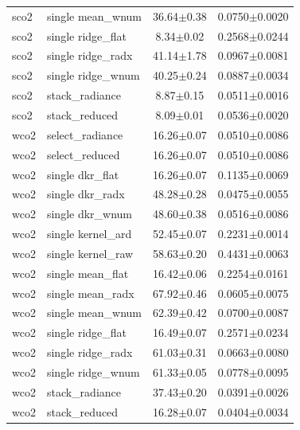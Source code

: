 \begin{tabular}{llcc}
sco2 & single mean\_wnum & 36.64$\pm$0.38 & 0.0750$\pm$0.0020 \\
sco2 & single ridge\_flat & 8.34$\pm$0.02 & 0.2568$\pm$0.0244 \\
sco2 & single ridge\_radx & 41.14$\pm$1.78 & 0.0967$\pm$0.0081 \\
sco2 & single ridge\_wnum & 40.25$\pm$0.24 & 0.0887$\pm$0.0034 \\
sco2 & stack\_radiance & 8.87$\pm$0.15 & 0.0511$\pm$0.0016 \\
sco2 & stack\_reduced & 8.09$\pm$0.01 & 0.0536$\pm$0.0020 \\
wco2 & select\_radiance & 16.26$\pm$0.07 & 0.0510$\pm$0.0086 \\
wco2 & select\_reduced & 16.26$\pm$0.07 & 0.0510$\pm$0.0086 \\
wco2 & single dkr\_flat & 16.26$\pm$0.07 & 0.1135$\pm$0.0069 \\
wco2 & single dkr\_radx & 48.28$\pm$0.28 & 0.0475$\pm$0.0055 \\
wco2 & single dkr\_wnum & 48.60$\pm$0.38 & 0.0516$\pm$0.0086 \\
wco2 & single kernel\_ard & 52.45$\pm$0.07 & 0.2231$\pm$0.0014 \\
wco2 & single kernel\_raw & 58.63$\pm$0.20 & 0.4431$\pm$0.0063 \\
wco2 & single mean\_flat & 16.42$\pm$0.06 & 0.2254$\pm$0.0161 \\
wco2 & single mean\_radx & 67.92$\pm$0.46 & 0.0605$\pm$0.0075 \\
wco2 & single mean\_wnum & 62.39$\pm$0.42 & 0.0700$\pm$0.0087 \\
wco2 & single ridge\_flat & 16.49$\pm$0.07 & 0.2571$\pm$0.0234 \\
wco2 & single ridge\_radx & 61.03$\pm$0.31 & 0.0663$\pm$0.0080 \\
wco2 & single ridge\_wnum & 61.33$\pm$0.05 & 0.0778$\pm$0.0095 \\
wco2 & stack\_radiance & 37.43$\pm$0.20 & 0.0391$\pm$0.0026 \\
wco2 & stack\_reduced & 16.28$\pm$0.07 & 0.0404$\pm$0.0034 \\
\bottomrule
\end{tabular}
